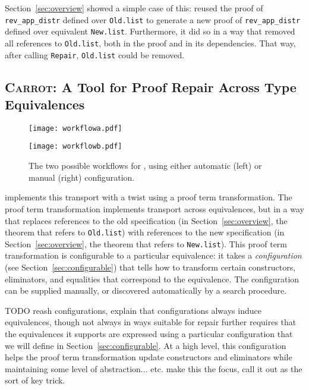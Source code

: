 Section~\ref{sec:overview} showed a simple case of this: \toolname
reused the proof of \lstinline{rev_app_distr} defined over \lstinline{Old.list}
to generate a new proof of \lstinline{rev_app_distr} defined over equivalent \lstinline{New.list}.
Furthermore, it did so in a way that removed all references to \lstinline{Old.list}, both in the proof
and in its dependencies.
That way, after calling \lstinline{Repair}, \lstinline{Old.list} could be removed.

\subsection{\textsc{Carrot}: A Tool for Proof Repair Across Type Equivalences}
\label{sec:time}

\begin{figure*}
\begin{minipage}{0.52\textwidth}
\texttt{[image: workflowa.pdf]}
\end{minipage}
\hfill
\begin{minipage}{0.45\textwidth}
\texttt{[image: workflowb.pdf]}
\vspace{0.97cm}
\end{minipage}
\vspace{-0.4cm}
\caption{The two possible workflows for \toolname, using either automatic (left) or manual (right) configuration.}
\label{fig:system}
\end{figure*}

\toolname implements this transport with a twist using a proof term transformation.
The proof term transformation implements transport across equivalences,
but in a way that replaces references to the old specification (in Section~\ref{sec:overview}, the theorem that refers to \lstinline{Old.list})
with references to the new specification (in Section~\ref{sec:overview}, the theorem that refers to \lstinline{New.list}).
This proof term transformation is configurable to a particular equivalence:
it takes a \textit{configuration} (see Section~\ref{sec:configurable}) 
that tells \toolname how to transform certain constructors, eliminators, and equalities that 
correspond to the equivalence.
The configuration can be supplied manually, or discovered automatically by a search procedure.

TODO reash configurations, explain that configurations always induce equivalences, though not always in ways suitable for repair
\toolname further requires that the equivalences it supports are expressed using a particular configuration that we will define in Section~\ref{sec:configurable}. At a high level, this configuration helps the proof term transformation update constructors and eliminators
while maintaining some level of abstraction... etc. make this the focus, call it out as the sort of key trick.

